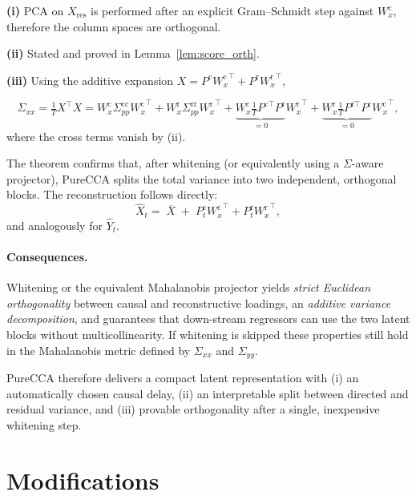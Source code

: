 \documentclass[14pt]{extarticle}
\begin{document}
	\begin{Proof}
		\textbf{(i)}  PCA on \(X_{\mathrm{res}}\) is performed after an
		explicit Gram–Schmidt step against \(W_x^{\mathrm c}\), therefore the
		column spaces are orthogonal.
		
		\textbf{(ii)}  Stated and proved in Lemma~\ref{lem:score_orth}.
		
		\textbf{(iii)}  Using the additive expansion
		\(X = P^{\mathrm c}{W_x^{\mathrm c}}^{\!\top} + P^{\mathrm r}{W_x^{\mathrm r}}^{\!\top}\),
		
		\[
		\Sigma_{xx}
		=\tfrac1T X^{\top}X
		= W_x^{\mathrm c}\Sigma_{pp}^{\mathrm{cc}}{W_x^{\mathrm c}}^{\!\top}
		+W_x^{\mathrm r}\Sigma_{pp}^{\mathrm{rr}}{W_x^{\mathrm r}}^{\!\top}
		+\underbrace{W_x^{\mathrm c}
			\tfrac1T P^{\mathrm c\!\top}P^{\mathrm r}}_{=0}
		{W_x^{\mathrm r}}^{\!\top}
		+\underbrace{W_x^{\mathrm r}
			\tfrac1T P^{\mathrm r\!\top}P^{\mathrm c}}_{=0}
		{W_x^{\mathrm c}}^{\!\top},
		\]
		where the cross terms vanish by (ii).
	\end{Proof}
	
	The theorem confirms that, after whitening (or equivalently using a
	$\Sigma$-aware projector), PureCCA splits the total variance into two
	independent, orthogonal blocks.
	The reconstruction follows directly:
	\[
	\widehat X_t
	= \;\overline{X}\;+\;
	P_t^{\mathrm c}{W_x^{\mathrm c}}^{\!\top}
	+P_t^{\mathrm r}{W_x^{\mathrm r}}^{\!\top},
	\]
	and analogously for \(\widehat Y_t\).
	
	\paragraph{Consequences.}
	Whitening or the equivalent Mahalanobis projector yields  
	\emph{strict Euclidean orthogonality} between causal and reconstructive
	loadings, an \emph{additive variance decomposition}, and guarantees that
	down-stream regressors can use the two latent blocks without
	multicollinearity.  
	If whitening is skipped these properties still hold in the Mahalanobis
	metric defined by \(\Sigma_{xx}\) and \(\Sigma_{yy}\).
	
	\bigskip
	\noindent
	PureCCA therefore delivers a compact latent representation with (i) an
	automatically chosen causal delay, (ii) an interpretable split between
	directed and residual variance, and (iii) provable orthogonality after a
	single, inexpensive whitening step.

	\section{Modifications} \label{sec:mods}
\end{document}

